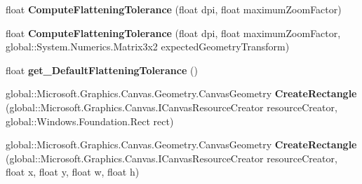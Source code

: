 \begin{DoxyCompactItemize}
\item 
\mbox{\label{interface_microsoft_1_1_graphics_1_1_canvas_1_1_geometry_1_1_i_canvas_geometry_statics_a985c955babc779083dbb22e1289f16fa}} 
float {\bfseries Compute\+Flattening\+Tolerance} (float dpi, float maximum\+Zoom\+Factor)
\item 
\mbox{\label{interface_microsoft_1_1_graphics_1_1_canvas_1_1_geometry_1_1_i_canvas_geometry_statics_a769679f8059f4a5c8dc679bb7d677866}} 
float {\bfseries Compute\+Flattening\+Tolerance} (float dpi, float maximum\+Zoom\+Factor, global\+::\+System.\+Numerics.\+Matrix3x2 expected\+Geometry\+Transform)
\item 
\mbox{\label{interface_microsoft_1_1_graphics_1_1_canvas_1_1_geometry_1_1_i_canvas_geometry_statics_a6b02aa62d9240152adb7fda7324bb0aa}} 
float {\bfseries get\+\_\+\+Default\+Flattening\+Tolerance} ()
\item 
\mbox{\label{interface_microsoft_1_1_graphics_1_1_canvas_1_1_geometry_1_1_i_canvas_geometry_statics_aff71f79d64e1ba2376363e2e42b22d9c}} 
global\+::\+Microsoft.\+Graphics.\+Canvas.\+Geometry.\+Canvas\+Geometry {\bfseries Create\+Rectangle} (global\+::\+Microsoft.\+Graphics.\+Canvas.\+I\+Canvas\+Resource\+Creator resource\+Creator, global\+::\+Windows.\+Foundation.\+Rect rect)
\item 
\mbox{\label{interface_microsoft_1_1_graphics_1_1_canvas_1_1_geometry_1_1_i_canvas_geometry_statics_ad213020482dda8837e816bbf8beb83b3}} 
global\+::\+Microsoft.\+Graphics.\+Canvas.\+Geometry.\+Canvas\+Geometry {\bfseries Create\+Rectangle} (global\+::\+Microsoft.\+Graphics.\+Canvas.\+I\+Canvas\+Resource\+Creator resource\+Creator, float x, float y, float w, float h)
\item 
\mbox{\label{interface_microsoft_1_1_graphics_1_1_canvas_1_1_geometry_1_1_i_canvas_geometry_statics_acbf2b94143b555578919975d9e78e754}} 

\end{DoxyCompactItemize}
